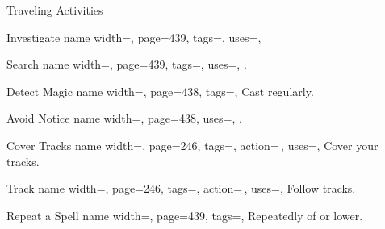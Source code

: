 \begin{PageFront}
\begin{Tables}{\frontTableHeight}
\begin{Table}{Traveling Activities}
\begin{entry}{Investigate}{%
                name width=\activityLength,%
                page=439,
                tags=\Concentrate,
                uses={\VariousKnowledge[tags=S]},
            }
                \quad
            \end{entry}
            \begin{entry}{Search}{%
                name width=\activityLength,%
                page=439,
                tags=\Concentrate,
                uses={\Perception[tags=S]},
            }
                . \hfill
            \end{entry}
            \begin{entry}{Detect Magic}{%
                name width=\activityLength,%
                page=438,
                tags=\Concentrate,
            }
                Cast  regularly.\hfill
            \end{entry}
            \breakLine
            \begin{entry}{Avoid Notice}{%
                name width=\activityLength,%
                page=438,
                uses={\Stealth[tags=S]},
            }
                .  \hfill{}\quad {}
            \end{entry}
            \begin{entry}{Cover Tracks}{%
                name width=\activityLength,%
                page=246,
                tags=\Move\Concentrate,
                action=\,,
                uses={\Survival[tags=T]},
            }
                Cover your tracks.
            \end{entry}
            \begin{entry}{Track}{%
                name width=\activityLength,%
                page=246,
                tags=\Move\Concentrate,
                action=\,,
                uses={\Survival[tags=T]},
            }
                Follow tracks.\hfill {}\quad
            \end{entry}
            \breakLine
            \begin{entry}{Repeat a Spell}{%
                name width=\activityLength,%
                page=439,
                tags=\Concentrate,
            }
                Repeatedly  of or lower.\hfill

\end{entry}
\end{Table}
\end{Tables}
\end{PageFront}
